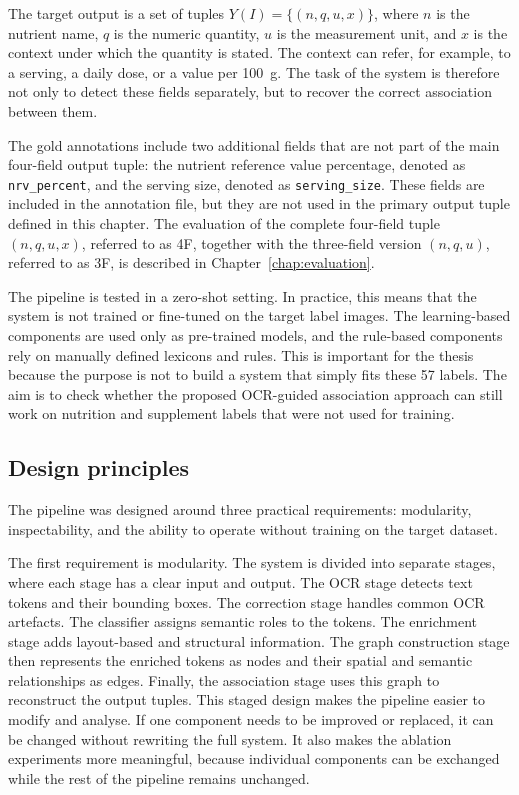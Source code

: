 The target output is a set of tuples \(Y(I) = \{(n, q, u, x)\}\), where \(n\) is the nutrient name, \(q\) is the numeric quantity, \(u\) is the measurement unit, and \(x\) is the context under which the quantity is stated. The context can refer, for example, to a serving, a daily dose, or a value per 100~g. The task of the system is therefore not only to detect these fields separately, but to recover the correct association between them.

The gold annotations include two additional fields that are not part of the main four-field output tuple: the nutrient reference value percentage, denoted as \texttt{nrv\_percent}, and the serving size, denoted as \texttt{serving\_size}. These fields are included in the annotation file, but they are not used in the primary output tuple defined in this chapter. The evaluation of the complete four-field tuple \((n, q, u, x)\), referred to as 4F, together with the three-field version \((n, q, u)\), referred to as 3F, is described in Chapter~\ref{chap:evaluation}.

The pipeline is tested in a zero-shot setting. In practice, this means that the system is not trained or fine-tuned on the target label images. The learning-based components are used only as pre-trained models, and the rule-based components rely on manually defined lexicons and rules. This is important for the thesis because the purpose is not to build a system that simply fits these 57 labels. The aim is to check whether the proposed OCR-guided association approach can still work on nutrition and supplement labels that were not used for training.

\subsection{Design principles}\label{sec:overview-principles}

The pipeline was designed around three practical requirements: modularity, inspectability, and the ability to operate without training on the target dataset.

The first requirement is modularity. The system is divided into separate stages, where each stage has a clear input and output. The OCR stage detects text tokens and their bounding boxes. The correction stage handles common OCR artefacts. The classifier assigns semantic roles to the tokens. The enrichment stage adds layout-based and structural information. The graph construction stage then represents the enriched tokens as nodes and their spatial and semantic relationships as edges. Finally, the association stage uses this graph to reconstruct the output tuples. This staged design makes the pipeline easier to modify and analyse. If one component needs to be improved or replaced, it can be changed without rewriting the full system. It also makes the ablation experiments more meaningful, because individual components can be exchanged while the rest of the pipeline remains unchanged.

